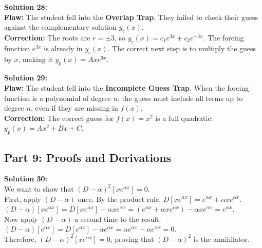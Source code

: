 \documentclass[11pt]{article}
\begin{document}
\textbf{Solution 28:} \\
\textbf{Flaw:} The student fell into the \textbf{Overlap Trap}. They failed to check their guess against the complementary solution $y_c(x)$. \\
\textbf{Correction:} The roots are $r = \pm 3$, so $y_c(x) = c_1 e^{3x} + c_2 e^{-3x}$. The forcing function $e^{3x}$ is already in $y_c(x)$. The correct next step is to multiply the guess by $x$, making it $y_p(x) = A x e^{3x}$.

\textbf{Solution 29:} \\
\textbf{Flaw:} The student fell into the \textbf{Incomplete Guess Trap}. When the forcing function is a polynomial of degree $n$, the guess must include all terms up to degree $n$, even if they are missing in $f(x)$. \\
\textbf{Correction:} The correct guess for $f(x) = x^2$ is a full quadratic: $y_p(x) = A x^2 + B x + C$.

\subsection*{Part 9: Proofs and Derivations}

\textbf{Solution 30:} \\
We want to show that $(D - \alpha)^2 [x e^{\alpha x}] = 0$. \\
First, apply $(D - \alpha)$ once. By the product rule, $D[x e^{\alpha x}] = e^{\alpha x} + \alpha x e^{\alpha x}$. \\
$(D - \alpha)[x e^{\alpha x}] = D[x e^{\alpha x}] - \alpha x e^{\alpha x} = (e^{\alpha x} + \alpha x e^{\alpha x}) - \alpha x e^{\alpha x} = e^{\alpha x}$. \\
Now apply $(D - \alpha)$ a second time to the result: \\
$(D - \alpha)[e^{\alpha x}] = D[e^{\alpha x}] - \alpha e^{\alpha x} = \alpha e^{\alpha x} - \alpha e^{\alpha x} = 0$. \\
Therefore, $(D - \alpha)^2 [x e^{\alpha x}] = 0$, proving that $(D - \alpha)^2$ is the annihilator.

\newpage
\end{document}
